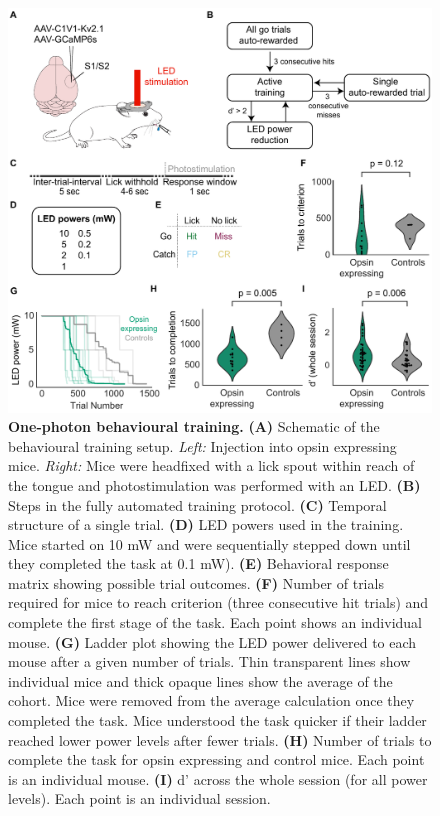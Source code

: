 \begin{figure}[h]
\includegraphics[scale=0.75]{figures/1-photon-behaviour.pdf}
\caption[\textbf{One-photon behavioural training.}]{
\textbf{One-photon behavioural training.}
\textbf{(A)} Schematic of the behavioural training setup. \textit{Left:} Injection into opsin expressing mice. \textit{Right:} Mice were headfixed with a lick spout within reach of the tongue and photostimulation was performed with an LED. \textbf{(B)} Steps in the fully automated training protocol. \textbf{(C)} Temporal structure of a single trial.  \textbf{(D)} LED powers used in the training. Mice started on 10 mW and were sequentially stepped down until they completed the task at 0.1 mW).  \textbf{(E)} Behavioral response matrix showing possible trial outcomes. \textbf{(F)} Number of trials required for mice to reach criterion (three consecutive hit trials) and complete the first stage of the task. Each point shows an individual mouse. \textbf{(G)} Ladder plot showing the LED power delivered to each mouse after a given number of trials. Thin transparent lines show individual mice and thick opaque lines show the average of the cohort. Mice were removed from the average calculation once they completed the task. Mice understood the task quicker if their ladder reached lower power levels after fewer trials. \textbf{(H)} Number of trials to complete the task for opsin expressing and control mice. Each point is an individual mouse. \textbf{(I)} d' across the whole session (for all power levels). Each point is an individual session.
} 
\label{fig:1-photon-behaviour}
\end{figure}

